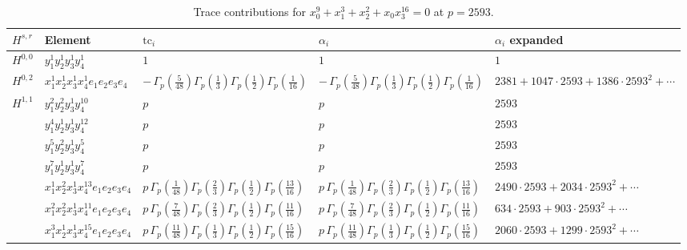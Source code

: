 \documentclass[11pt]{article}
\begin{document}
\begin{table}[ht]
\centering
\caption{Trace contributions for $x_0^{9} + x_1^{3} + x_2^{2} + x_0 x_3^{16} = 0$ at $p=2593$.}\label{tab:deformed-44}
\renewcommand{\arraystretch}{1.1}
{\scriptsize
\begin{tabular}{@{}lllll@{}}
\toprule
$H^{s,r}$ & Element & $\mathrm{tc}_i$ & $\alpha_i$ & $\alpha_i$ expanded \\
\midrule
$H^{0,0}$ & $y_{1}^{1} y_{2}^{1} y_{3}^{1} y_{4}^{1}$ & $1$ & $1$ & $1$ \\
\midrule
$H^{0,2}$ & $x_{1}^{1} x_{2}^{1} x_{3}^{1} x_{4}^{1}  e_{1} e_{2} e_{3} e_{4}$ & $- \, \Gamma_p \left( \frac{5}{48} \right) \Gamma_p \left( \frac{1}{3} \right) \Gamma_p \left( \frac{1}{2} \right) \Gamma_p \left( \frac{1}{16} \right)$ & $- \, \Gamma_p \left( \frac{5}{48} \right) \Gamma_p \left( \frac{1}{3} \right) \Gamma_p \left( \frac{1}{2} \right) \Gamma_p \left( \frac{1}{16} \right)$ & $2381{+}1047{\cdot}2593{+}1386{\cdot}2593^{2}{+}\cdots$ \\
\midrule
$H^{1,1}$ & $y_{1}^{2} y_{2}^{2} y_{3}^{1} y_{4}^{10}$ & $p \,$ & $p \,$ & $2593$ \\
 & $y_{1}^{4} y_{2}^{1} y_{3}^{1} y_{4}^{12}$ & $p \,$ & $p \,$ & $2593$ \\
 & $y_{1}^{5} y_{2}^{2} y_{3}^{1} y_{4}^{5}$ & $p \,$ & $p \,$ & $2593$ \\
 & $y_{1}^{7} y_{2}^{1} y_{3}^{1} y_{4}^{7}$ & $p \,$ & $p \,$ & $2593$ \\
 & $x_{1}^{1} x_{2}^{2} x_{3}^{1} x_{4}^{13}  e_{1} e_{2} e_{3} e_{4}$ & $p \, \Gamma_p \left( \frac{1}{48} \right) \Gamma_p \left( \frac{2}{3} \right) \Gamma_p \left( \frac{1}{2} \right) \Gamma_p \left( \frac{13}{16} \right)$ & $p \, \Gamma_p \left( \frac{1}{48} \right) \Gamma_p \left( \frac{2}{3} \right) \Gamma_p \left( \frac{1}{2} \right) \Gamma_p \left( \frac{13}{16} \right)$ & $2490{\cdot}2593{+}2034{\cdot}2593^{2}{+}\cdots$ \\
 & $x_{1}^{2} x_{2}^{2} x_{3}^{1} x_{4}^{11}  e_{1} e_{2} e_{3} e_{4}$ & $p \, \Gamma_p \left( \frac{7}{48} \right) \Gamma_p \left( \frac{2}{3} \right) \Gamma_p \left( \frac{1}{2} \right) \Gamma_p \left( \frac{11}{16} \right)$ & $p \, \Gamma_p \left( \frac{7}{48} \right) \Gamma_p \left( \frac{2}{3} \right) \Gamma_p \left( \frac{1}{2} \right) \Gamma_p \left( \frac{11}{16} \right)$ & $634{\cdot}2593{+}903{\cdot}2593^{2}{+}\cdots$ \\
 & $x_{1}^{3} x_{2}^{1} x_{3}^{1} x_{4}^{15}  e_{1} e_{2} e_{3} e_{4}$ & $p \, \Gamma_p \left( \frac{11}{48} \right) \Gamma_p \left( \frac{1}{3} \right) \Gamma_p \left( \frac{1}{2} \right) \Gamma_p \left( \frac{15}{16} \right)$ & $p \, \Gamma_p \left( \frac{11}{48} \right) \Gamma_p \left( \frac{1}{3} \right) \Gamma_p \left( \frac{1}{2} \right) \Gamma_p \left( \frac{15}{16} \right)$ & $2060{\cdot}2593{+}1299{\cdot}2593^{2}{+}\cdots$ \\

\end{tabular}}
\end{table}
\end{document}
